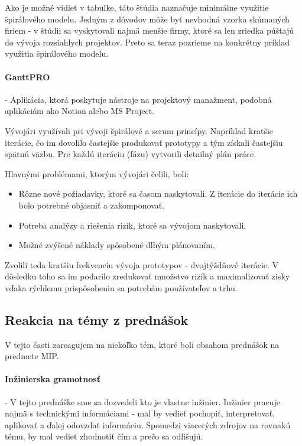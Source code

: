 \documentclass[10pt,twoside,slovak,a4paper]{article}
\begin{document}
Ako je možné vidieť v tabuľke, táto štúdia naznačuje minimálne využitie špirálového modelu. Jedným z dôvodov môže byť nevhodná vzorka skúmaných firiem - v štúdii sa vyskytovali najmä menšie firmy, ktoré sa len zriedka púštajú do vývoja rozsiahlych projektov. Preto sa teraz pozrieme na konkrétny príklad využitia špirálového modelu.

\paragraph{GanttPRO} - Aplikácia, ktorá poskytuje nástroje na projektový manažment, podobná aplikáciám ako Notion alebo MS Project.

Vývojári využívali pri vývoji špirálové a scrum princípy. Napríklad kratšie iterácie, čo im dovolilo častejšie produkovať prototypy a tým získali častejšiu spätnú väzbu. Pre každú iteráciu (fázu) vytvorili detailný plán práce.

Hlavnými problémami, ktorým vývojári čelili, boli:
\begin{itemize}
\item Rôzne nové požiadavky, ktoré sa časom naskytovali. Z iterácie do iterácie ich bolo potrebné objasniť a zakomponovať.
\item Potreba analýzy a riešenia rizík, ktoré sa vývojom naskytovali.
\item Možné zvýšené náklady spôsobené dlhým plánovaním.
\end{itemize}
Zvolili teda kratšiu frekvenciu vývoja prototypov - dvojtýždňové iterácie. V dôsledku toho sa im podarilo zredukovať množstvo rizík a maximalizovať zisky vďaka rýchlemu prispôsobeniu sa potrebám používateľov a trhu. \cite{SpiralModelExample}

\subsection{Reakcia na témy z prednášok} \label{reakciaNaTemy}
V tejto časti zareagujem na niekoľko tém, ktoré boli obsahom prednášok na predmete MIP.

 \paragraph{Inžinierska gramotnosť} - V tejto prednáške sme sa dozvedeli kto je vlastne inžinier. Inžinier pracuje najmä s technickými informáciami - mal by vedieť pochopiť, interpretovať, aplikovať a ďalej odovzdať informáciu. Spomedzi viacerých zdrojov na rovnakú tému, by mal vedieť zhodnotiť čím a prečo sa odlišujú.
\end{document}

